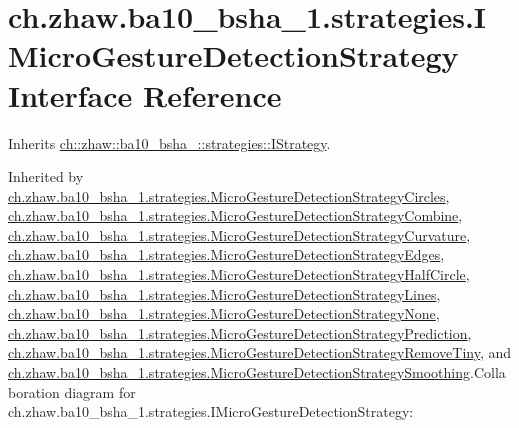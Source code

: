 \hypertarget{interfacech_1_1zhaw_1_1ba10__bsha__1_1_1strategies_1_1IMicroGestureDetectionStrategy}{
\section{ch.zhaw.ba10\_\-bsha\_\-1.strategies.IMicroGestureDetectionStrategy Interface Reference}
\label{interfacech_1_1zhaw_1_1ba10__bsha__1_1_1strategies_1_1IMicroGestureDetectionStrategy}
}


Inherits \hyperlink{interfacech_1_1zhaw_1_1ba10__bsha__1_1_1strategies_1_1IStrategy}{ch::zhaw::ba10\_\-bsha\_::strategies::IStrategy}.

Inherited by \hyperlink{classch_1_1zhaw_1_1ba10__bsha__1_1_1strategies_1_1MicroGestureDetectionStrategyCircles}{ch.zhaw.ba10\_\-bsha\_\-1.strategies.MicroGestureDetectionStrategyCircles}, \hyperlink{classch_1_1zhaw_1_1ba10__bsha__1_1_1strategies_1_1MicroGestureDetectionStrategyCombine}{ch.zhaw.ba10\_\-bsha\_\-1.strategies.MicroGestureDetectionStrategyCombine}, \hyperlink{classch_1_1zhaw_1_1ba10__bsha__1_1_1strategies_1_1MicroGestureDetectionStrategyCurvature}{ch.zhaw.ba10\_\-bsha\_\-1.strategies.MicroGestureDetectionStrategyCurvature}, \hyperlink{classch_1_1zhaw_1_1ba10__bsha__1_1_1strategies_1_1MicroGestureDetectionStrategyEdges}{ch.zhaw.ba10\_\-bsha\_\-1.strategies.MicroGestureDetectionStrategyEdges}, \hyperlink{classch_1_1zhaw_1_1ba10__bsha__1_1_1strategies_1_1MicroGestureDetectionStrategyHalfCircle}{ch.zhaw.ba10\_\-bsha\_\-1.strategies.MicroGestureDetectionStrategyHalfCircle}, \hyperlink{classch_1_1zhaw_1_1ba10__bsha__1_1_1strategies_1_1MicroGestureDetectionStrategyLines}{ch.zhaw.ba10\_\-bsha\_\-1.strategies.MicroGestureDetectionStrategyLines}, \hyperlink{classch_1_1zhaw_1_1ba10__bsha__1_1_1strategies_1_1MicroGestureDetectionStrategyNone}{ch.zhaw.ba10\_\-bsha\_\-1.strategies.MicroGestureDetectionStrategyNone}, \hyperlink{classch_1_1zhaw_1_1ba10__bsha__1_1_1strategies_1_1MicroGestureDetectionStrategyPrediction}{ch.zhaw.ba10\_\-bsha\_\-1.strategies.MicroGestureDetectionStrategyPrediction}, \hyperlink{classch_1_1zhaw_1_1ba10__bsha__1_1_1strategies_1_1MicroGestureDetectionStrategyRemoveTiny}{ch.zhaw.ba10\_\-bsha\_\-1.strategies.MicroGestureDetectionStrategyRemoveTiny}, and \hyperlink{classch_1_1zhaw_1_1ba10__bsha__1_1_1strategies_1_1MicroGestureDetectionStrategySmoothing}{ch.zhaw.ba10\_\-bsha\_\-1.strategies.MicroGestureDetectionStrategySmoothing}.Collaboration diagram for ch.zhaw.ba10\_\-bsha\_\-1.strategies.IMicroGestureDetectionStrategy:\nopagebreak
